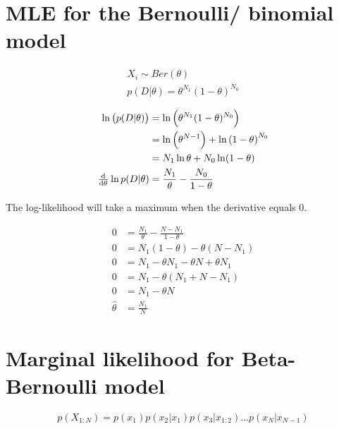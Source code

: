 \documentclass{article}
\begin{document}
\def\ci{\perp\!\!\!\perp}
\def\defeq{\buildrel\triangle\over =}
\def\E{\mathrm{E}}
\def\Var{\mathrm{Var}}
\def\Cov{\mathrm{Cov}}
\def\Reals{\rm I\!R}
\newcommand\numberthis{\stepcounter{equation}\tag{\theequation}}


\section{MLE for the Bernoulli/ binomial model}

\begin{gather}
X_i \sim Ber(\theta) \\
p(D|\theta) = \theta^{N_1}(1 - \theta)^{N_0}
\end{gather}

\begin{align*}
  \ln \left(  p(D|\theta) \right) &= \ln \left( \theta^{N_1}(1 -
                                    \theta)^{N_0} \right) \\
                                  &= \ln \left( \theta^{N-1} \right) + \ln \left( 1 - \theta
                                    \right)^{N_0} \\
                                  &= N_1 \ln \theta + N_0 \ln (1 - \theta) \\
  \od{}{\theta} \ln p(D|\theta) &= \frac{N_1}{\theta} - \frac{N_0}{1 -
                                  \theta}
\end{align*}

The log-likelihood will take a maximum when the derivative equals 0.

\begin{align*}
  0 &= \frac{N_1}{\theta} - \frac{N - N_1}{1 - \theta} \\
  0 &= N_1(1 - \theta) - \theta(N-N_1) \\
  0 &= N_1 - \theta N_1 - \theta N + \theta N_1 \\
  0 &= N_1 - \theta(N_1 + N - N_1) \\
  0 &= N_1 - \theta N \\
  \hat{\theta} &= \frac{N_1}{N}
\end{align*}
\section{Marginal likelihood for Beta-Bernoulli model}\label{3.2}
\begin{equation}\label{chain-rule-prob}
  p(X_{1:N}) = p(x_1)p(x_2|x_1)p(x_3|x_{1:2}) ... p(x_N|x_{N-1})
\end{equation}
\end{document}
